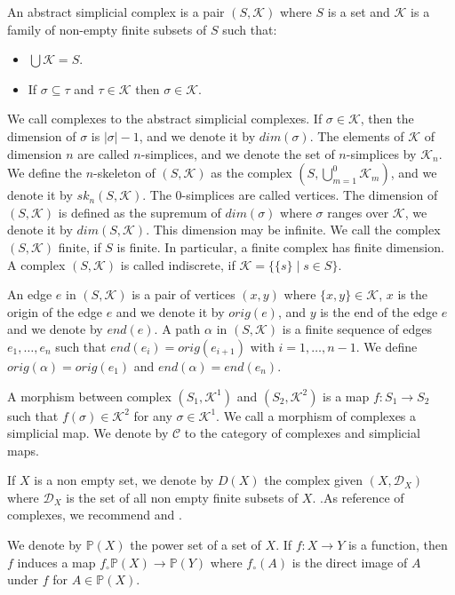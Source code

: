\documentclass{amsart}
\begin{document}
An abstract simplicial complex is a pair $(S,\mathcal{K})$ where $S$ is a set and $\mathcal{K}$ is a family of non-empty finite subsets of $S$ such that:
\begin{itemize}
\item $\bigcup\mathcal{K}=S$.
\item If $\sigma\subseteq \tau$ and $\tau\in \mathcal{K}$ then $\sigma\in\mathcal{K}$.
\end{itemize}
We call complexes to the abstract simplicial complexes.  If $\sigma\in \mathcal{K}$, then the dimension of $\sigma$ is $\vert\sigma\vert-1$, and we denote it by $dim(\sigma)$. The elements of $\mathcal{K}$ of dimension $n$ are called $n$-simplices, and we denote the set of $n$-simplices by $\mathcal{K}_n$. We define the $n$-skeleton of $(S,\mathcal{K})$ as the complex $(S,\bigcup_{m=1}^0\mathcal{K}_m)$, and we denote it by $sk_n(S,\mathcal{K})$. The $0$-simplices are called vertices. The dimension of $(S,\mathcal{K})$ is defined as the supremum of $dim(\sigma)$ where $\sigma$ ranges over $\mathcal{K}$, we denote it by $dim(S,\mathcal{K})$. This dimension may be infinite. We call the complex $(S,\mathcal{K})$  finite, if $S$ is finite. In particular, a finite complex has finite dimension. A complex $(S,\mathcal{K})$ is called indiscrete, if $\mathcal{K}=\{\{s\}\mid s\in S\}$.

An edge $e$ in $(S,\mathcal{K})$ is a pair of vertices  $(x,y)$ where $\{x,y\}\in\mathcal{K}$, $x$ is the origin of the edge $e$ and we denote it by $orig(e)$, and $y$ is the end of the edge $e$ and we denote by $end(e)$. A path $\alpha$ in $(S,\mathcal{K})$ is a finite sequence of edges $e_1,\dots,e_n$ such that $end(e_i)=orig(e_{i+1})$ with $i=1,\dots,n-1$. We define $orig(\alpha)=orig(e_1)$ and $end(\alpha)=end(e_n)$. 

A morphism between complex $(S_1,\mathcal{K}^1)$ and $(S_2,\mathcal{K}^2)$ is a map $f\colon S_1\longrightarrow S_2$ such that $f(\sigma)\in \mathcal{K}^2$ for any $\sigma\in\mathcal{K}^1$. We call a morphism of complexes a simplicial map. We  denote by $\mathcal{C}$ to the category of complexes and simplicial maps.

If $X$ is a non empty set, we denote by $D(X)$ the complex given $(X,\mathcal{D}_X)$ where $\mathcal{D}_X$ is the set of all non empty finite subsets of $X$. .As reference of complexes, we recommend \cite{singer2015lecture}  and \cite{spanier1989algebraic}.


We denote by $\mathbb{P}(X)$ the power set of a set of $X$. If $f\colon X\longrightarrow Y$ is a function, then $f$ induces a map $f_\circ \mathbb{P}(X)\longrightarrow \mathbb{P}(Y)$ where $f_\circ(A)$ is the direct image of $A$ under $f$ for $A\in\mathbb{P}(X)$. 
\end{document}
